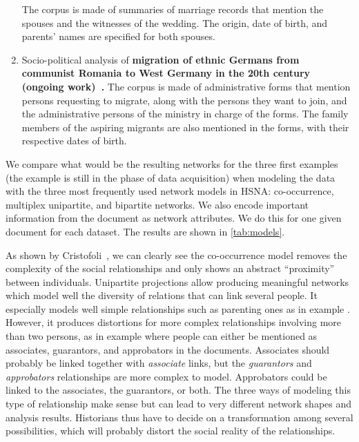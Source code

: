 \begin{enumerate}[nosep,leftmargin=*]
    The corpus is made of summaries of marriage records that mention the spouses and the witnesses of the wedding.
    The origin, date of birth, and parents' names are specified for both spouses.
    \item Socio-political analysis of \textbf{migration of ethnic Germans from communist Romania to West Germany in the 20th century (ongoing work)~\cite{diminescuMigrationEthnicGermans2020}.}
    The corpus is made of administrative forms that mention persons requesting to migrate, along with the persons they want to join, and the administrative persons of the ministry in charge of the forms.
    The family members of the aspiring migrants are also mentioned in the forms, with their respective dates of birth.
\end{enumerate}

We compare what would be the resulting networks for the three first examples (the example \dana is still in the phase of data acquisition) when modeling the data with the three most frequently used network models in HSNA: co-occurrence, multiplex unipartite, and bipartite networks.
We also encode important information from the document as network attributes.
We do this for one given document for each dataset.
The results are shown in \autoref{tab:models}.

As shown by Cristofoli~\cite{cristofoliAuxSourcesGrands2008}, we can clearly see the co-occurrence model removes the complexity of the social relationships and only shows an abstract ``proximity'' between individuals.
Unipartite projections allow producing meaningful networks which model well the diversity of relations that can link several people.
It especially models well simple relationships such as parenting ones as in example \nicole.
However, it produces distortions for more complex relationships involving more than two persons, as in example \pascal where people can either be mentioned as associates, guarantors, and approbators in the documents.
Associates should probably be linked together with \textit{associate} links, but the \textit{guarantors} and \textit{approbators} relationships are more complex to model.
Approbators could be linked to the associates, the guarantors, or both.
The three ways of modeling this type of relationship make sense but can lead to very different network shapes and analysis results.
Historians thus have to decide on a transformation among several possibilities, which will probably distort the social reality of the relationships.

